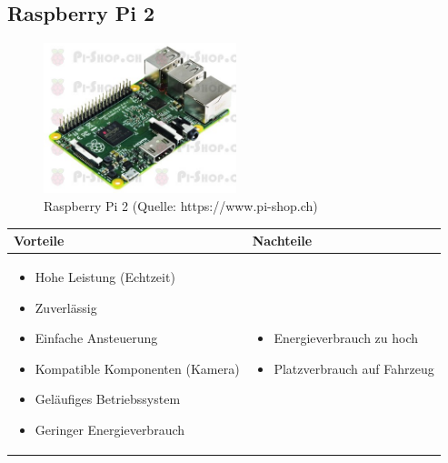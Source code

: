 \pagebreak


\subsection{Raspberry Pi 2}

\begin{figure}[h!]%
\centering
\includegraphics[width=0.5\textwidth]{fig/PI2.jpg}
\caption{Raspberry Pi 2 (Quelle: https://www.pi-shop.ch)}
\label{fig:PI2}
\end{figure}

\begin{table}[h]
\begin{tabular}{p{} | p{}}


 \textbf{Vorteile} & \textbf{Nachteile} \\ \hline
	 
\begin{itemize}
\item Hohe Leistung (Echtzeit)
\item Zuverlässig
\item Einfache Ansteuerung
\item Kompatible Komponenten (Kamera)
\item Geläufiges Betriebssystem
\item Geringer Energieverbrauch
\end{itemize}

 
 &
 
\begin{itemize}
\item Energieverbrauch zu hoch
\item Platzverbrauch auf Fahrzeug
\end{itemize}

\end{tabular}
\end{table}

